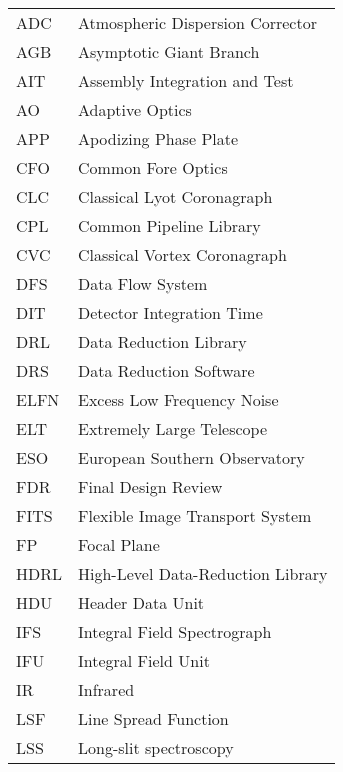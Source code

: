 
\begin{longtable}{p{2cm}p{14cm}}
  ADC     & Atmospheric Dispersion Corrector           \\
  AGB     & Asymptotic Giant Branch                    \\
  AIT     & Assembly Integration and Test              \\
  AO      & Adaptive Optics                            \\
  APP     & Apodizing Phase Plate                      \\
  CFO     & Common Fore Optics                         \\
  CLC     & Classical Lyot Coronagraph                 \\
  CPL     & Common Pipeline Library                    \\
  CVC     & Classical Vortex Coronagraph               \\
  DFS     & Data Flow System                           \\
  DIT     & Detector Integration Time                  \\
  DRL     & Data Reduction Library                     \\
  DRS     & Data Reduction Software                    \\
  ELFN    & Excess Low Frequency Noise                 \\
  ELT     & Extremely Large Telescope                  \\
  ESO     & European Southern Observatory              \\
  FDR     & Final Design Review                        \\
  FITS    & Flexible Image Transport System            \\
  FP      & Focal Plane                                \\
  HDRL    & High-Level Data-Reduction Library          \\
  HDU     & Header Data Unit                           \\
  IFS     & Integral Field Spectrograph                \\
  IFU     & Integral Field Unit                        \\
  IR      & Infrared                                   \\
  LSF     & Line Spread Function                       \\
  LSS     & Long-slit spectroscopy                     \\

\end{longtable}
